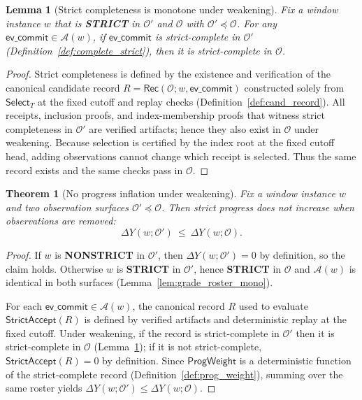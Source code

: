 \documentclass[11pt]{article}
\newcommand{\1}{\mathbf{1}}
\theoremstyle{definition}
\theoremstyle{plain}
\newtheorem{theorem}{Theorem}
\newtheorem{lemma}{Lemma}
\begin{document}
\begin{lemma}[Strict completeness is monotone under weakening]
\label{lem:complete_mono}
Fix a window instance $w$ that is \textbf{STRICT} in $\mathcal{O}'$ and $\mathcal{O}$ with $\mathcal{O}'\preceq\mathcal{O}$.
For any $\textsf{ev\_commit}\in\mathcal{A}(w)$, if $\textsf{ev\_commit}$ is strict-complete in $\mathcal{O}'$ (Definition~\ref{def:complete_strict}), then it is strict-complete in $\mathcal{O}$.
\end{lemma}

\begin{proof}
Strict completeness is defined by the existence and verification of the canonical candidate record
$R=\mathsf{Rec}(\mathcal{O};w,\textsf{ev\_commit})$ constructed solely from $\mathsf{Select}_T$ at the fixed cutoff and replay checks (Definition~\ref{def:cand_record}).
All receipts, inclusion proofs, and index-membership proofs that witness strict completeness in $\mathcal{O}'$ are verified artifacts; hence they also exist in $\mathcal{O}$ under weakening.
Because selection is certified by the index root at the fixed cutoff head, adding observations cannot change which receipt is selected.
Thus the same record exists and the same checks pass in $\mathcal{O}$.
\end{proof}

\begin{theorem}[No progress inflation under weakening]
\label{thm:no_inflation}
Fix a window instance $w$ and two observation surfaces $\mathcal{O}'\preceq\mathcal{O}$.
Then strict progress does not increase when observations are removed:
\[
\Delta Y(w;\mathcal{O}')\ \le\ \Delta Y(w;\mathcal{O}).
\]
\end{theorem}

\begin{proof}
If $w$ is \textbf{NONSTRICT} in $\mathcal{O}'$, then $\Delta Y(w;\mathcal{O}')=0$ by definition, so the claim holds.
Otherwise $w$ is \textbf{STRICT} in $\mathcal{O}'$, hence \textbf{STRICT} in $\mathcal{O}$ and $\mathcal{A}(w)$ is identical in both surfaces (Lemma~\ref{lem:grade_roster_mono}).

For each $\textsf{ev\_commit}\in\mathcal{A}(w)$, the canonical record $R$ used to evaluate $\mathsf{StrictAccept}(R)$ is defined by verified artifacts and deterministic replay at the fixed cutoff.
Under weakening, if the record is strict-complete in $\mathcal{O}'$ then it is strict-complete in $\mathcal{O}$ (Lemma~\ref{lem:complete_mono}); if it is not strict-complete, $\mathsf{StrictAccept}(R)=0$ by definition.
Since $\mathsf{ProgWeight}$ is a deterministic function of the strict-complete record (Definition~\ref{def:prog_weight}), summing over the same roster yields $\Delta Y(w;\mathcal{O}')\le \Delta Y(w;\mathcal{O})$.
\end{proof}
\end{document}
